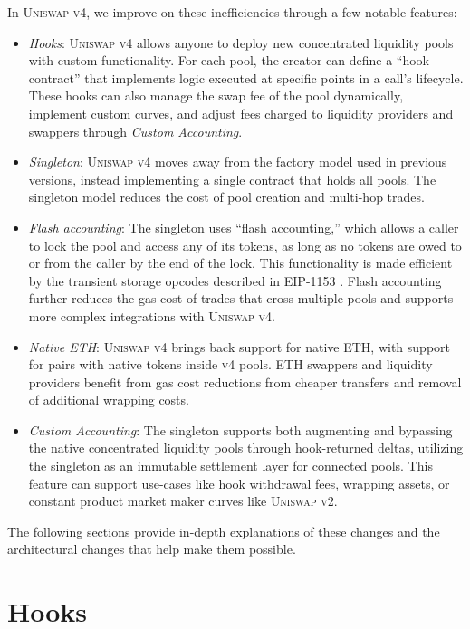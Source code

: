 \documentclass[sigconf,nonacm,prologue,table]{acmart}
\numberwithin{equation}{section}
\theoremstyle{definition}
\theoremstyle{remark}
\begin{document}
In \textsc{Uniswap v4}, we improve on these inefficiencies through a few notable features:
\begin{itemize}
    \item \emph{Hooks}: \textsc{Uniswap v4} allows anyone to deploy new concentrated liquidity pools with custom functionality. For each pool, the creator can define a “hook contract” that implements logic executed at specific points in a call’s lifecycle. These hooks can also manage the swap fee of the pool dynamically, implement custom curves, and adjust fees charged to liquidity providers and swappers through \emph{Custom Accounting}.
    \item \emph{Singleton}: \textsc{Uniswap v4} moves away from the factory model used in previous versions, instead implementing a single contract that holds all pools. The singleton model reduces the cost of pool creation and multi-hop trades.
    \item \emph{Flash accounting}:  The singleton uses “flash accounting,” which allows a caller to lock the pool and access any of its tokens, as long as no tokens are owed to or from the caller by the end of the lock. This functionality is made efficient by the transient storage opcodes described in EIP-1153 \cite{Akhunov2018}. Flash accounting further reduces the gas cost of trades that cross multiple pools and supports more complex integrations with \textsc{Uniswap v4}.
    \item \emph{Native ETH}: \textsc{Uniswap v4} brings back support for native ETH, with support for pairs with native tokens inside \textsc{v4} pools. ETH swappers and liquidity providers benefit from gas cost reductions from cheaper transfers and removal of additional wrapping costs.
   \item \emph{Custom Accounting}: The singleton supports both augmenting and bypassing the native concentrated liquidity pools through hook-returned deltas, utilizing the singleton as an immutable settlement layer for connected pools. This feature can support use-cases like hook withdrawal fees, wrapping assets, or constant product market maker curves like \textsc{Uniswap v2}.
\end{itemize}

The following sections provide in-depth explanations of these changes and the architectural changes that help make them possible.

\section{Hooks} 
\label{sec:Hooks}
\end{document}
